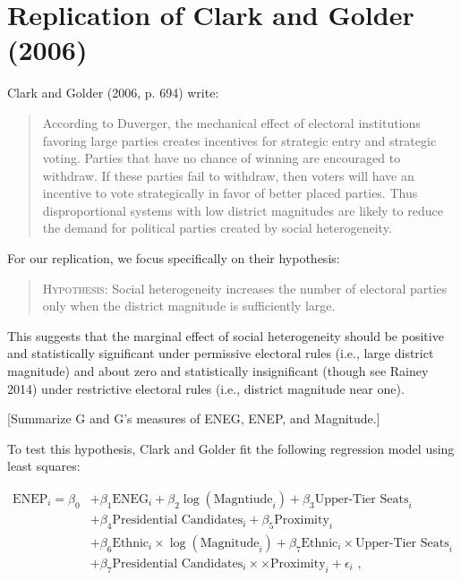 \documentclass[10pt]{article}
\begin{document}
\section*{Replication of Clark and Golder (2006)}

Clark and Golder (2006, p. 694) write: 

\begin{quote}
According to Duverger, the mechanical effect of electoral institutions favoring large parties creates incentives for strategic entry and strategic voting. Parties that have no chance of winning are encouraged to withdraw. If these parties fail to withdraw, then voters will have an incentive to vote strategically in favor of better placed parties. Thus disproportional systems with low district magnitudes are likely to reduce the demand for political parties created by social heterogeneity.
\end{quote}

For our replication, we focus specifically on their hypothesis:
\begin{quote}
\textsc{Hypothesis:} Social heterogeneity increases the number of electoral parties only when the district magnitude is sufficiently large.
\end{quote}

This suggests that the marginal effect of social heterogeneity should be positive and statistically significant under permissive electoral rules (i.e., large district magnitude) and about zero and statistically insignificant (though see Rainey 2014) under restrictive electoral rules (i.e., district magnitude near one).

[Summarize G and G's measures of ENEG, ENEP, and Magnitude.]

To test this hypothesis, Clark and Golder fit the following regression model using least squares:

\begin{align*}
\text{ENEP}_i = \beta_0 &+ \beta_1 \text{ENEG}_i + \beta_2 \log(\text{Magntiude}_i) + \beta_3 \text{Upper-Tier Seats}_i\\
						     &+\beta_4 \text{Presidential Candidates}_i + \beta_5 \text{Proximity}_i\\
						     &+ \beta_6 \text{Ethnic}_i \times \log (\text{Magnitude}_i) + \beta_7 \text{Ethnic}_i \times \text{Upper-Tier Seats}_i\\
						     &+ \beta_7 \text{Presidential Candidates}_i \times \times \text{Proximity}_i + \epsilon_i\text{ ,}
\end{align*}
\end{document}
